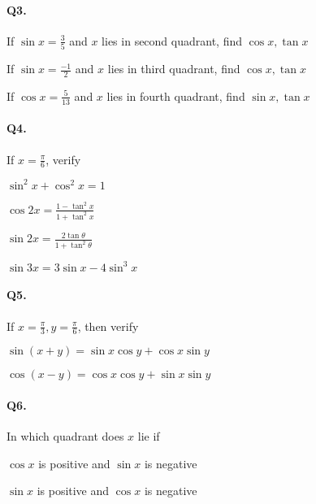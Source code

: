\documentclass{article}
\begin{document}
\paragraph{Q3.}

\begin{enumerate*}[label=\alph*)]
  \item If $\sin x= \frac{3}{5}$ and $x$ lies in second quadrant, find $\cos x, \tan x$
  \item If $\sin x= \frac{-1}{2}$ and $x$ lies in third quadrant, find $\cos x, \tan x$
  \item If $\cos x= \frac{5}{13}$ and $x$ lies in fourth quadrant, find $\sin x, \tan x$
\end{enumerate*}

\paragraph{Q4.}
If $x=\frac{\pi}{6}$, verify

\begin{enumerate*}[label=\roman*)]
  \item $\sin^{2}x + \cos^{2}x = 1$
  \item $\cos 2x = \frac{1-\tan^{2}x}{1+\tan^{2}x}$
  \item $\sin 2x = \frac{2\tan \theta}{1+\tan^{2}\theta}$
  \item $\sin 3x = 3\sin x - 4\sin^{3}x$
\end{enumerate*}

\paragraph{Q5.}
If $x = \frac{\pi}{3}, y=\frac{\pi}{6}$, then verify

\begin{enumerate*}[label=\roman*)]
  \item $\sin(x+y) = \sin x \cos y + \cos x \sin y$
  \item $\cos(x-y) = \cos x \cos y + \sin x \sin y$
\end{enumerate*}

\paragraph{Q6.}
In which quadrant does $x$ lie if

\begin{enumerate*}[label=\roman*)]
  \item $\cos x$ is positive and $\sin x$ is negative
  \item $\sin x$ is positive and $\cos x$ is negative
\end{enumerate*}
\end{document}
